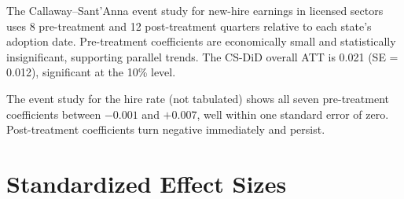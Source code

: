 \documentclass[12pt]{article}
\begin{document}
The Callaway--Sant'Anna event study for new-hire earnings in licensed sectors uses 8 pre-treatment and 12 post-treatment quarters relative to each state's adoption date. Pre-treatment coefficients are economically small and statistically insignificant, supporting parallel trends. The CS-DiD overall ATT is 0.021 (SE = 0.012), significant at the 10\% level.

The event study for the hire rate (not tabulated) shows all seven pre-treatment coefficients between $-0.001$ and $+0.007$, well within one standard error of zero. Post-treatment coefficients turn negative immediately and persist.

\section{Standardized Effect Sizes}
\label{sec:sde}


\end{document}
